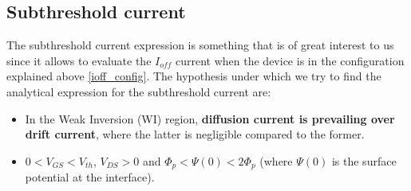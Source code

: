 \documentclass[a4paper, 12pt, twoside, openright]{report}
\begin{document}
\subsection{Subthreshold current} %

The subthreshold current expression is something that is of great interest to us since it allows to evaluate the $I_{off}$ current when the device is in the configuration explained above \ref{ioff_config}. The hypothesis under which we try to find the analytical expression for the subthreshold current are:

\begin{itemize}
\item In the Weak Inversion (WI) region, \textbf{diffusion current is prevailing over drift current}, where the latter is negligible compared to the former.
\item $0<V_{GS}<V_{th}$, $V_{DS}>0$ and $\Phi_{p}<\Psi(0)<2\Phi_{p}$ (where $\Psi(0)$ is the surface potential at the interface). 
\end{itemize}
\end{document}
